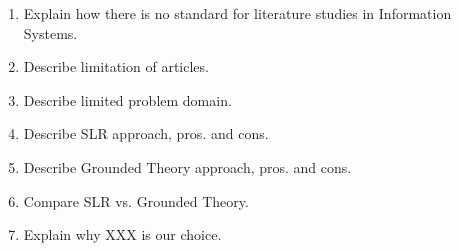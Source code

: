 \begin{enumerate}
	\item Explain how there is no standard for literature studies in Information Systems.
	\item Describe limitation of articles.
	\item Describe limited problem domain.
	\item Describe SLR approach, pros. and cons.
	\item Describe Grounded Theory approach, pros. and cons.
	\item Compare SLR vs. Grounded Theory.
	\item Explain why XXX is our choice.
\end{enumerate}


